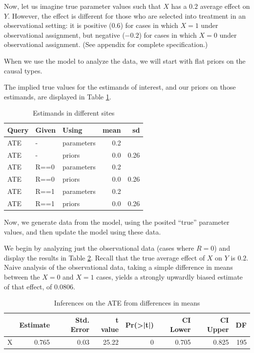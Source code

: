 \documentclass[
  12pt,
]{book}
\begin{document}
Now, let us imagine true parameter values such that \(X\) has a \(0.2\) average effect on \(Y\). However, the effect is different for those who are selected into treatment in an observational setting: it is positive (\(0.6\)) for cases in which \(X=1\) under observational assignment, but negative (\(-0.2\)) for cases in which \(X=0\) under observational assignment. (See appendix for complete specification.)

When we use the model to analyze the data, we will start with flat priors on the causal types.

The implied true values for the estimands of interest, and our priors on those estimands, are displayed in Table \ref{tab:fusionestimands}.

\begin{table}

\caption{\label{tab:fusionestimands}Estimands in different sites}
\centering
\begin{tabular}[t]{l|l|l|r|r}
\hline
Query & Given & Using & mean & sd\\
\hline
ATE & - & parameters & 0.2 & \\
\hline
ATE & - & priors & 0.0 & 0.26\\
\hline
ATE & R==0 & parameters & 0.2 & \\
\hline
ATE & R==0 & priors & 0.0 & 0.26\\
\hline
ATE & R==1 & parameters & 0.2 & \\
\hline
ATE & R==1 & priors & 0.0 & 0.26\\
\hline
\end{tabular}
\end{table}

Now, we generate data from the model, using the posited ``true'' parameter values, and then update the model using these data.

We begin by analyzing just the observational data (cases where \(R=0\)) and display the results in Table \ref{tab:fusiondim}. Recall that the true average effect of \(X\) on \(Y\) is \(0.2\). Naive analysis of the observational data, taking a simple difference in means between the \(X=0\) and \(X=1\) cases, yields a strongly upwardly biased estimate of that effect, of 0.0806.

\begin{table}

\caption{\label{tab:fusiondim}Inferences on the ATE from differences in means}
\centering
\begin{tabular}[t]{l|r|r|r|r|r|r|r}
\hline
  & Estimate & Std. Error & t value & Pr(>|t|) & CI Lower & CI Upper & DF\\
\hline
X & 0.765 & 0.03 & 25.22 & 0 & 0.705 & 0.825 & 195\\
\hline
\end{tabular}
\end{table}
\end{document}
